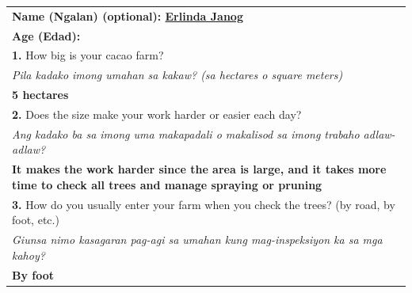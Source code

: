 {\begin{longtable}{|p{4cm}|p{10cm}|}
		\multicolumn{2}{|l|}{\textbf{Name (Ngalan) (optional): \underline{Erlinda Janog}
		}}                                                                                                                                                                                     \\
		\multicolumn{2}{|l|}{\textbf{Age (Edad):}}                                                                                                                                             \\

		\multicolumn{2}{|p{12cm}|}{\vspace{0.1cm} \textbf{1.} How big is your cacao farm?}                                                                                                     \\
		\multicolumn{2}{|p{12cm}|}{\textit{Pila kadako imong umahan sa kakaw? (sa hectares o square meters)}}                                                                                  \\
		\multicolumn{2}{|p{12cm}|}{\textbf{5 hectares}}                                                                                                                                        \\

		\multicolumn{2}{|p{12cm}|}{\vspace{0.1cm}  \textbf{2.} Does the size make your work harder or easier each day?}                                                                        \\
		\multicolumn{2}{|p{12cm}|}{\textit{Ang kadako ba sa imong uma makapadali o makalisod sa imong trabaho adlaw-adlaw?}}                                                                   \\
		\multicolumn{2}{|p{12cm}|}{\textbf{It makes the work harder since the area is large, and it takes more time to check all trees and manage spraying or pruning}}                        \\

		\multicolumn{2}{|p{12cm}|}{\vspace{0.1cm} \textbf{3.} How do you usually enter your farm when you check the trees? (by road, by foot, etc.)}                                           \\
		\multicolumn{2}{|p{12cm}|}{\textit{Giunsa nimo kasagaran pag-agi sa umahan kung mag-inspeksiyon ka sa mga kahoy?}}                                                                     \\
		\multicolumn{2}{|p{12cm}|}{\textbf{By foot}}                                                                                                                                           \\


\end{longtable}}
